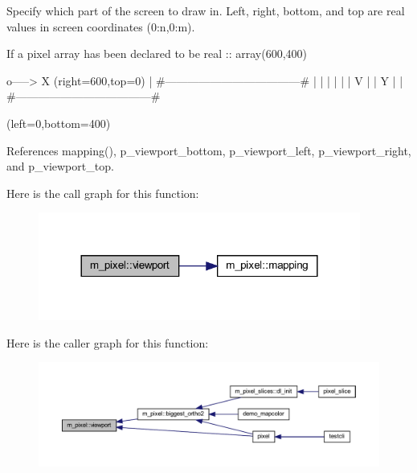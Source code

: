 Specify which part of the screen to draw in. Left, right, bottom, and top are real values in screen coordinates (0\+:n,0\+:m).

If a pixel array has been declared to be real \+:\+: array(600,400) \begin{DoxyVerb} o-----> X                         (right=600,top=0)
 | #------------------------------------#
 | |                                    |
 | |                                    |
 V |                                    |
 Y |                                    |
   #------------------------------------#
\end{DoxyVerb}
 (left=0,bottom=400) 

References mapping(), p\+\_\+viewport\+\_\+bottom, p\+\_\+viewport\+\_\+left, p\+\_\+viewport\+\_\+right, and p\+\_\+viewport\+\_\+top.

Here is the call graph for this function\+:
\nopagebreak
\begin{figure}[H]
\begin{center}
\leavevmode
\includegraphics[width=300pt]{namespacem__pixel_a43247343cd316e3aa075b44b5166e2e9_cgraph}
\end{center}
\end{figure}
Here is the caller graph for this function\+:
\nopagebreak
\begin{figure}[H]
\begin{center}
\leavevmode
\includegraphics[width=350pt]{namespacem__pixel_a43247343cd316e3aa075b44b5166e2e9_icgraph}
\end{center}
\end{figure}
\mbox{\label{namespacem__pixel_a9e23c9a3a5f3b1482986f067fbf8487f}} 
